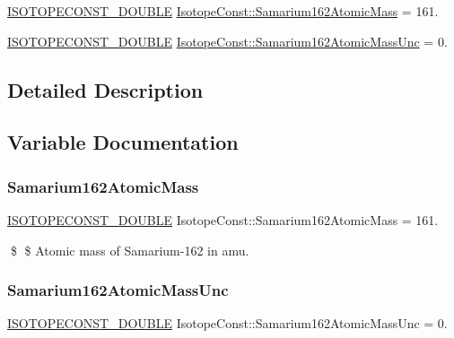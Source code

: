 \begin{DoxyCompactItemize}
\item 
\mbox{\hyperlink{group___isotope_const-_macros_ga8f45a7272ce02c0b4c65c44636ed719a}{I\+S\+O\+T\+O\+P\+E\+C\+O\+N\+S\+T\+\_\+\+D\+O\+U\+B\+LE}} \mbox{\hyperlink{group___isotope_const-_samarium-_sm162_ga12263f53f103a66c7010c14b33c23dc0}{Isotope\+Const\+::\+Samarium162\+Atomic\+Mass}} = 161.
\item 
\mbox{\hyperlink{group___isotope_const-_macros_ga8f45a7272ce02c0b4c65c44636ed719a}{I\+S\+O\+T\+O\+P\+E\+C\+O\+N\+S\+T\+\_\+\+D\+O\+U\+B\+LE}} \mbox{\hyperlink{group___isotope_const-_samarium-_sm162_ga6fa98e7ed3cac0367d1c422dbae2ccfb}{Isotope\+Const\+::\+Samarium162\+Atomic\+Mass\+Unc}} = 0.
\end{DoxyCompactItemize}


\subsection{Detailed Description}


\subsection{Variable Documentation}
\mbox{\label{group___isotope_const-_samarium-_sm162_ga12263f53f103a66c7010c14b33c23dc0}} 
\subsubsection{\texorpdfstring{Samarium162\+Atomic\+Mass}{Samarium162AtomicMass}}
{\footnotesize\ttfamily \mbox{\hyperlink{group___isotope_const-_macros_ga8f45a7272ce02c0b4c65c44636ed719a}{I\+S\+O\+T\+O\+P\+E\+C\+O\+N\+S\+T\+\_\+\+D\+O\+U\+B\+LE}} Isotope\+Const\+::\+Samarium162\+Atomic\+Mass = 161.}

\$ \$ Atomic mass of Samarium-\/162 in amu. \mbox{\label{group___isotope_const-_samarium-_sm162_ga6fa98e7ed3cac0367d1c422dbae2ccfb}} 
\subsubsection{\texorpdfstring{Samarium162\+Atomic\+Mass\+Unc}{Samarium162AtomicMassUnc}}
{\footnotesize\ttfamily \mbox{\hyperlink{group___isotope_const-_macros_ga8f45a7272ce02c0b4c65c44636ed719a}{I\+S\+O\+T\+O\+P\+E\+C\+O\+N\+S\+T\+\_\+\+D\+O\+U\+B\+LE}} Isotope\+Const\+::\+Samarium162\+Atomic\+Mass\+Unc = 0.}

